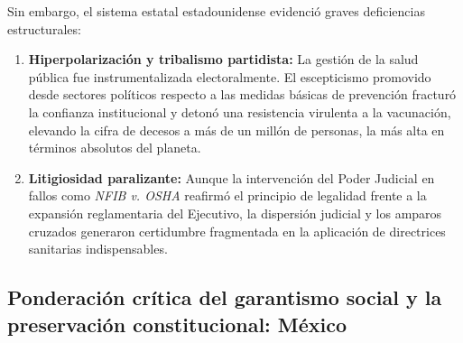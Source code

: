 \documentclass[12pt,spanish,letterpaper,oneside]{article}
\begin{document}
Sin embargo, el sistema estatal estadounidense evidenci\'o graves deficiencias estructurales:
\begin{enumerate}
  \item \textbf{Hiperpolarizaci\'on y tribalismo partidista:} La gesti\'on de la salud p\'ublica fue instrumentalizada electoralmente. El escepticismo promovido desde sectores pol\'iticos respecto a las medidas b\'asicas de prevenci\'on fractur\'o la confianza institucional y deton\'o una resistencia virulenta a la vacunaci\'on, elevando la cifra de decesos a m\'as de un mill\'on de personas, la m\'as alta en t\'erminos absolutos del planeta.
  \item \textbf{Litigiosidad paralizante:} Aunque la intervenci\'on del Poder Judicial en fallos como \emph{NFIB v. OSHA} \citep{scotusNfib2022} reafirm\'o el principio de legalidad frente a la expansi\'on reglamentaria del Ejecutivo, la dispersi\'on judicial y los amparos cruzados generaron certidumbre fragmentada en la aplicaci\'on de directrices sanitarias indispensables.
\end{enumerate}

\subsection{Ponderaci\'on cr\'itica del garantismo social y la preservaci\'on constitucional: M\'exico}
\end{document}
